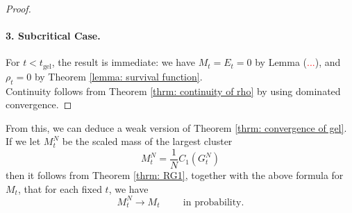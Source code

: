 \begin{proof}
\paragraph{3. Subcritical Case.} For $t<t_\text{gel}$, the result is immediate: we have $M_t=E_t=0$ by Lemma (\textcolor{red}{...}), and $\rho_t=0$ by Theorem \ref{lemma: survival function}. \medskip \\ Continuity follows from Theorem \ref{thrm: continuity of rho} by using dominated convergence. \end{proof}
\begin{remark} From this, we can deduce a weak version of Theorem \ref{thrm: convergence of gel}. If we let $M^N_t$ be the scaled mass of the largest cluster \begin{equation}
    M^N_t=\frac{1}{N}C_1(G^N_t)
\end{equation} then it follows from Theorem \ref{thrm: RG1}, together with the above formula for $M_t$, that for each fixed $t$, we have \begin{equation}
    M^N_t \rightarrow M_t \hspace{1cm} \text{in probability.}
\end{equation} \end{remark}

